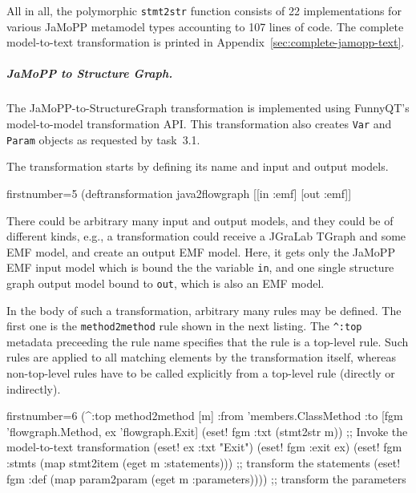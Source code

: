 \documentclass[submission]{eptcs}
\begin{document}
All in all, the polymorphic \verb|stmt2str| function consists of 22
implementations for various JaMoPP metamodel types accounting to 107 lines of
code.  The complete model-to-text transformation is printed in
Appendix~\ref{sec:complete-jamopp-text}.


\subparagraph{JaMoPP to Structure Graph.}
\label{sec:jamopp-struct-graph}

The JaMoPP-to-StructureGraph transformation is implemented using FunnyQT's
model-to-model transformation API.  This transformation also creates \verb|Var|
and \verb|Param| objects as requested by task~3.1.

The transformation starts by defining its name and input and output models.

\begin{clojurecode*}{firstnumber=5}
(deftransformation java2flowgraph [[in :emf] [out :emf]]
\end{clojurecode*}

There could be arbitrary many input and output models, and they could be of
different kinds, e.g., a transformation could receive a JGraLab TGraph and some
EMF model, and create an output EMF model.  Here, it gets only the JaMoPP EMF
input model which is bound the the variable \verb|in|, and one single structure
graph output model bound to \verb|out|, which is also an EMF model.

In the body of such a transformation, arbitrary many rules may be defined.  The
first one is the \verb|method2method| rule shown in the next listing.  The
\verb|^:top| metadata preceeding the rule name specifies that the rule is a
top-level rule.  Such rules are applied to all matching elements by the
transformation itself, whereas non-top-level rules have to be called explicitly
from a top-level rule (directly or indirectly).

\begin{clojurecode*}{firstnumber=6}
  (^:top method2method [m]
         :from 'members.ClassMethod
         :to [fgm 'flowgraph.Method, ex 'flowgraph.Exit]
         (eset! fgm :txt (stmt2str m)) ;; Invoke the model-to-text transformation
         (eset! ex :txt "Exit")
         (eset! fgm :exit ex)
         (eset! fgm :stmts (map stmt2item (eget m :statements)))  ;; transform the statements
         (eset! fgm :def (map param2param (eget m :parameters)))) ;; transform the parameters
\end{clojurecode*}
\end{document}
